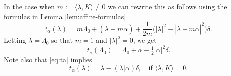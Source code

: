 \documentclass[12pt]{article}
\begin{document}
In the case when $m := \langle \lambda, K\rangle \neq 0$ we can rewrite this
as follows using the formulas in Lemma \ref{lem:affine-formulas}
\begin{equation}
    t_\alpha(\lambda)
    = m \Lambda_0 + (\overline{\lambda} + m \alpha)
    + \frac{1}{2m}\big(|\lambda|^2 - |\overline{\lambda} + m\alpha|^2\big)\delta.
\end{equation}
Letting $\lambda = \Lambda_0$ so that $m=1$ and $|\lambda|^2=0$, we get
\begin{equation}
    t_\alpha(\Lambda_0) = \Lambda_0 + \alpha - \tfrac{1}{2}|\alpha|^2 \delta.
\end{equation}
Note also that \eqref{eq:ta} implies
\begin{equation}
    t_\alpha(\lambda) = \lambda - (\lambda|\alpha)\delta,
    \quad \text{if } \langle \lambda, K\rangle = 0.
\end{equation}
\end{document}
